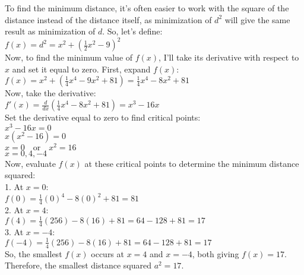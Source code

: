 \begin{abox}

To find the minimum distance, it's often easier to work with the square of the distance instead of the distance itself, as minimization of $ d^2 $ will give the same result as minimization of $ d $. So, let's define:\\

$ f(x) = d^2 = x^2 + \left( \frac{1}{2}x^2 - 9 \right)^2 $\\


Now, to find the minimum value of $ f(x) $, I'll take its derivative with respect to $ x $ and set it equal to zero. First, expand $ f(x) $:\\

$ f(x) = x^2 + \left( \frac{1}{4}x^4 - 9x^2 + 81 \right) = \frac{1}{4}x^4 - 8x^2 + 81 $\\

Now, take the derivative:\\

$ f'(x) = \frac{d}{dx} \left( \frac{1}{4}x^4 - 8x^2 + 81 \right) = x^3 - 16x $\\

Set the derivative equal to zero to find critical points:\\

$ x^3 - 16x = 0 $\\
$ x(x^2 - 16) = 0 $\\
$ x = 0 \quad \text{or} \quad x^2 = 16 $\\
$ x = 0, 4, -4 $\\

Now, evaluate $ f(x) $ at these critical points to determine the minimum distance squared:\\

1. At $ x = 0 $:\\
$ f(0) = \frac{1}{4}(0)^4 - 8(0)^2 + 81 = 81 $\\

2. At $ x = 4 $:\\
$ f(4) = \frac{1}{4}(256) - 8(16) + 81 = 64 - 128 + 81 = 17 $\\

3. At $ x = -4 $:\\
$ f(-4) = \frac{1}{4}(256) - 8(16) + 81 = 64 - 128 + 81 = 17 $\\

So, the smallest $ f(x) $ occurs at $ x = 4 $ and $ x = -4 $, both giving $ f(x) = 17 $. Therefore, the smallest distance squared $ a^2 = 17 $.\\
\end{abox}
